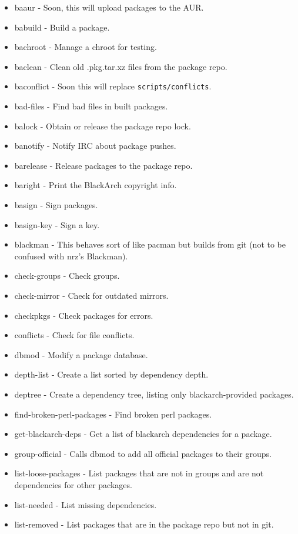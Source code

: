 \documentclass[a4paper, oneside,12pt]{scrartcl}
\begin{document}
\begin{itemize}
\item baaur - Soon, this will upload packages to the AUR.
\item babuild - Build a package.
\item bachroot - Manage a chroot for testing.
\item baclean - Clean old .pkg.tar.xz files from the package repo.
\item baconflict - Soon this will replace \verb|scripts/conflicts|.
\item bad-files - Find bad files in built packages.
\item balock - Obtain or release the package repo lock.
\item banotify - Notify IRC about package pushes.
\item barelease - Release packages to the package repo.
\item baright - Print the BlackArch copyright info.
\item basign - Sign packages.
\item basign-key - Sign a key.
\item blackman - This behaves sort of like pacman but builds from git (not to be
    confused with nrz's Blackman).
\item check-groups - Check groups.
\item check-mirror - Check for outdated mirrors.
\item checkpkgs - Check packages for errors.
\item conflicts - Check for file conflicts.
\item dbmod - Modify a package database.
\item depth-list - Create a list sorted by dependency depth.
\item deptree - Create a dependency tree, listing only blackarch-provided packages.
\item find-broken-perl-packages - Find broken perl packages.
\item get-blackarch-deps - Get a list of blackarch dependencies for a package.
\item group-official - Calls dbmod to add all official packages to their groups.
\item list-loose-packages - List packages that are not in groups and are not
    dependencies for other packages.
\item list-needed - List missing dependencies.
\item list-removed - List packages that are in the package repo but not in git.

\end{itemize}
\end{document}
